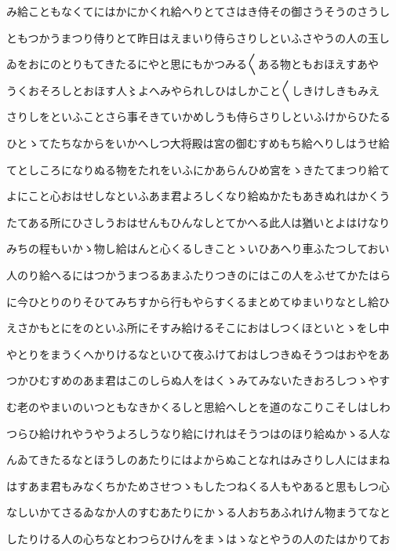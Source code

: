 \documentclass[a4paper,11pt,landscape]{ltjtarticle}
\begin{document}
み給こともなくてにはかにかくれ給へりとてさはき侍その御さうそうのさうし
\par\medskip
ともつかうまつり侍りとて昨日はえまいり侍らさりしといふさやうの人の玉し
\par\medskip
ゐをおにのとりもてきたるにやと思にもかつみる〱ある物ともおほえすあや
\par\medskip
うくおそろしとおほす人〻よへみやられしひはしかこと〱しきけしきもみえ
\par\medskip
さりしをといふことさら事そきていかめしうも侍らさりしといふけからひたる
\par\medskip
ひとゝてたちなからをいかへしつ大将殿は宮の御むすめもち給へりしはうせ給
\par\medskip
てとしころになりぬる物をたれをいふにかあらんひめ宮をゝきたてまつり給て
\par\medskip
よにこと心おはせしなといふあま君よろしくなり給ぬかたもあきぬれはかくう
\par\medskip
たてある所にひさしうおはせんもひんなしとてかへる此人は猶いとよはけなり
\par\medskip
みちの程もいかゝ物し給はんと心くるしきことゝいひあへり車ふたつしておい
\par\medskip
人のり給へるにはつかうまつるあまふたりつきのにはこの人をふせてかたはら
\par\medskip
に今ひとりのりそひてみちすから行もやらすくるまとめてゆまいりなとし給ひ
\par\medskip
えさかもとにをのといふ所にそすみ給けるそこにおはしつくほといとゝをし中
\par\medskip
やとりをまうくへかりけるなといひて夜ふけておはしつきぬそうつはおやをあ
\par\medskip
つかひむすめのあま君はこのしらぬ人をはくゝみてみないたきおろしつゝやす
\par\medskip
む老のやまいのいつともなきかくるしと思給へしとを道のなこりこそしはしわ
\par\medskip
つらひ給けれやうやうよろしうなり給にけれはそうつはのほり給ぬかゝる人な
\par\medskip
んゐてきたるなとほうしのあたりにはよからぬことなれはみさりし人にはまね
\par\medskip
はすあま君もみなくちかためさせつゝもしたつねくる人もやあると思もしつ心
\par\medskip
なしいかてさるゐなか人のすむあたりにかゝる人おちあふれけん物まうてなと
\par\medskip
したりける人の心ちなとわつらひけんをまゝはゝなとやうの人のたはかりてお
\par\medskip
\end{document}
